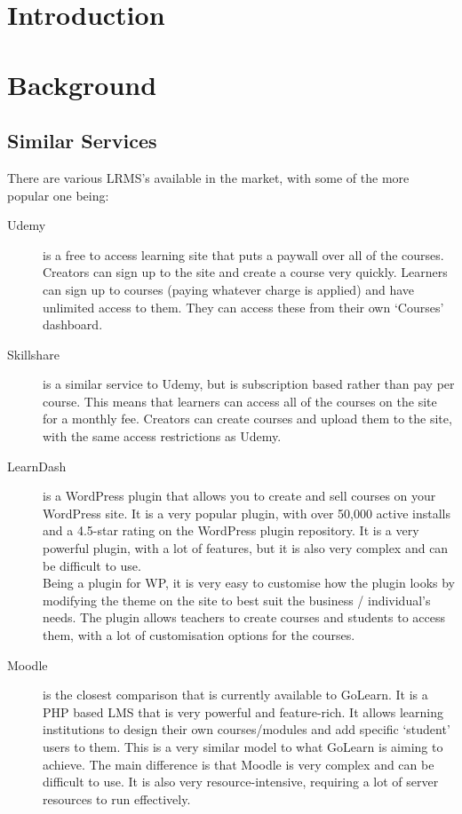 \documentclass[11pt, a4paper,twoside]{report}
\theoremstyle{plain} %
\theoremstyle{definition} %
\numberwithin{equation}{chapter}
\begin{document}
\chapter{Introduction}\label{ch:introduction}


\chapter{Background}\label{ch:background}

\section{Similar Services}\label{sec:similarservices}

There are various LRMS's available in the market, with some of the more popular
one being:

\begin{description}
    \item[Udemy] {
        is a free to access learning site that puts a paywall over all of
        the courses. Creators can sign up to the site and create a course very
        quickly. Learners can sign up to courses (paying whatever charge is
        applied) and have unlimited access to them. They can access these from
        their own `Courses' dashboard.
        }
    \item[Skillshare] {
        is a similar service to Udemy, but is subscription based rather than
        pay per course. This means that learners can access all of the courses
        on the site for a monthly fee. Creators can create courses and upload
        them to the site, with the same access restrictions as Udemy.
        }
    \item[LearnDash\cite{learndash}] {
        is a WordPress plugin that allows you to create and sell
        courses on your WordPress site. It is a very popular plugin, with
        over 50,000 active installs and a 4.5-star rating on the WordPress
        plugin repository. It is a very powerful plugin, with a lot of
        features, but it is also very complex and can be difficult to use.\\
        Being a plugin for WP, it is very easy to customise how the plugin
        looks by modifying the theme on the site to best suit the business /
        individual's needs. The plugin allows teachers to create courses and
        students to access them, with a lot of customisation options for the
        courses.
        }
    \item[Moodle\cite{moodle}] {
        is the closest comparison that is currently available to GoLearn. It
        is a PHP based LMS that is very powerful and feature-rich. It allows
        learning institutions to design their own courses/modules and add
        specific `student' users to them. This is a very similar model to
        what GoLearn is aiming to achieve. The main difference is that Moodle
        is very complex and can be difficult to use. It is also very
        resource-intensive, requiring a lot of server resources to run
        effectively.
        }
\end{description}
\end{document}
